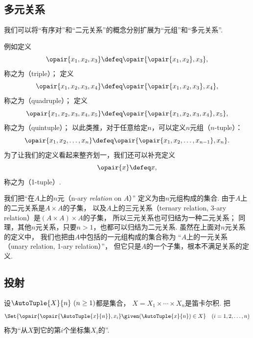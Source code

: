 \subsection{多元关系}
我们可以将“有序对”和“二元关系”的概念分别扩展为“元组”和“多元关系”.

例如定义
\begin{equation*}
    \opair{x_1,x_2,x_3}
    \defeq
    \opair{\opair{x_1,x_2},x_3},
\end{equation*}
称之为（triple）；
定义
\begin{equation*}
    \opair{x_1,x_2,x_3,x_4}
    \defeq
    \opair{\opair{x_1,x_2,x_3},x_4},
\end{equation*}
称之为（quadruple）；
定义
\begin{equation*}
    \opair{x_1,x_2,x_3,x_4,x_5}
    \defeq
    \opair{\opair{x_1,x_2,x_3,x_4},x_5},
\end{equation*}
称之为（quintuple）；
以此类推，对于任意给定\(n\)，可以定义\(n\)元组（\(n\)-tuple）：
\begin{equation*}
    \opair{x_1,x_2,\dotsc,x_n}
    \defeq
    \opair{\opair{x_1,x_2,\dotsc,x_{n-1}},x_n}.
\end{equation*}
为了让我们的定义看起来整齐划一，我们还可以补充定义
\begin{equation*}
    \opair{x} \defeq x,
\end{equation*}
称之为（1-tuple）.

我们把“在\(A\)上的\(n\)元（n-ary \emph{relation} on \(A\)）”
定义为由\(n\)元组构成的集合.
由于\(A\)上的二元关系是\(A \times A\)的子集，
以及\(A\)上的三元关系（ternary relation, 3-ary relation）是\((A \times A) \times A\)的子集，
所以三元关系也可归结为一种二元关系；
同理，其他\(n\)元关系，只要\(n>1\)，也都可以归结为二元关系.
虽然在上面对\(n\)元关系的定义中，
我们也把由\(A\)中包括的一元组构成的集合称为
“\(A\)上的一元关系（unary relation, 1-ary relation）”，
但它只是\(A\)的一个子集，根本不满足关系的定义.

\subsection{投射}
\begin{definition}
    设\(\AutoTuple{X}{n}\ (n\geq1)\)都是集合，
    \(X = X_1 \times \dotsb \times X_n\)是笛卡尔积.
    把
    \begin{equation*}
        \Set{
        \opair{
        \opair{\AutoTuple{x}{n}},
        x_i
        }
        \given
        (\AutoTuple{x}{n}) \in X
        }
        \quad(i=1,2,\dotsc,n)
    \end{equation*}
    称为“从\(X\)到它的第\(i\)个坐标集\(X_i\)的”.
\end{definition}
